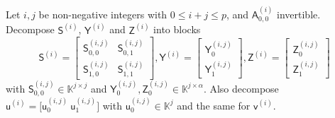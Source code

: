 \documentclass{sig-alternate}
\newcommand{\vu}{\ensuremath{\mathsf{u}}}
\newcommand{\vv}{\ensuremath{\mathsf{v}}}
\newcommand{\mA}{\ensuremath{\mathsf{A}}}
\newcommand{\mS}{\ensuremath{\mathsf{S}}}
\newcommand{\mY}{\ensuremath{\mathsf{Y}}}
\newcommand{\mZ}{\ensuremath{\mathsf{Z}}}
\newcommand{\K}{\ensuremath{\mathbb{K}}}
\begin{document}
Let $i,j$ be non-negative integers with $0 \le i+j \le p$, and
${\mA^{(i)}_{0,0}}$ invertible. Decompose $\mS^{(i)}$, $\mY^{(i)}$ and
$\mZ^{(i)}$ into blocks
\begin{equation*}
\mS^{(i)} = \begin{bmatrix} 
\mS^{(i,j)}_{0,0} & \mS^{(i,j)}_{0,1} \\
\mS^{(i,j)}_{1,0} & \mS^{(i,j)}_{1,1}
\end{bmatrix},  
\mY^{(i)} = 
\begin{bmatrix}
  \mY^{(i,j)}_0 \\\mY^{(i,j)}_1
\end{bmatrix},
\mZ^{(i)} = 
\begin{bmatrix}
  \mZ^{(i,j)}_0 \\\mZ^{(i,j)}_1
\end{bmatrix}
\end{equation*}
with $\mS^{(i,j)}_{0,0} \in \K^{j \times j}$ and
$\mY^{(i,j)}_0, \mZ^{(i,j)}_0 \in \K^{j \times \alpha}$. Also decompose 
%
$\vu^{(i)} = 
\big[ \vu^{(i,j)}_0 \  \vu^{(i,j)}_1 \big]
$ 
%
with $\vu^{(i,j)}_0 \in \K^j$ and the same for $\vv^{(i)}$.
\end{document}
